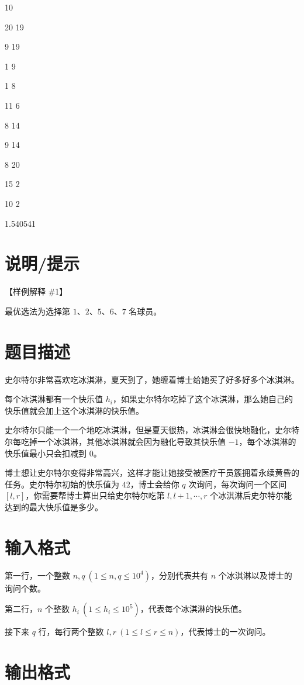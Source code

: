 \documentclass{../cpct/ctpro}
\begin{document}
\testcasetab
{
    10\par
    20 19\par
    9 19\par
    1 9\par
    1 8\par
    11 6\par
    8 14\par
    9 14\par
    8 20\par
    15 2\par
    10 2
}
{
    1.540541
}

\section*{说明/提示}

【样例解释 \#1】

最优选法为选择第 $1$、$2$、$5$、$6$、$7$ 名球员。

\makeproblem
\section*{题目描述}

史尔特尔非常喜欢吃冰淇淋，夏天到了，她缠着博士给她买了好多好多个冰淇淋。

每个冰淇淋都有一个快乐值 $h_i$，如果史尔特尔吃掉了这个冰淇淋，那么她自己的快乐值就会加上这个冰淇淋的快乐值。

史尔特尔只能一个一个地吃冰淇淋，但是夏天很热，冰淇淋会很快地融化，史尔特尔每吃掉一个冰淇淋，其他冰淇淋就会因为融化导致其快乐值 $-1$，每个冰淇淋的快乐值最小只会扣减到 $0$。

博士想让史尔特尔变得非常高兴，这样才能让她接受被医疗干员簇拥着永续黄昏的任务。史尔特尔初始的快乐值为 $42$，博士会给你 $q$ 次询问，每次询问一个区间 $[l,r]$，你需要帮博士算出只给史尔特尔吃第 $l,l+1,\cdots,r$ 个冰淇淋后史尔特尔能达到的最大快乐值是多少。

\section*{输入格式}

第一行，一个整数 $n,q~(1 \leq n,q \leq {10}^4)$，分别代表共有 $n$ 个冰淇淋以及博士的询问个数。

第二行，$n$ 个整数 $h_i~(1 \leq h_i \leq {10}^5)$，代表每个冰淇淋的快乐值。

接下来 $q$ 行，每行两个整数 $l,r~(1 \leq l \leq r \leq n)$，代表博士的一次询问。

\section*{输出格式}
\end{document}
